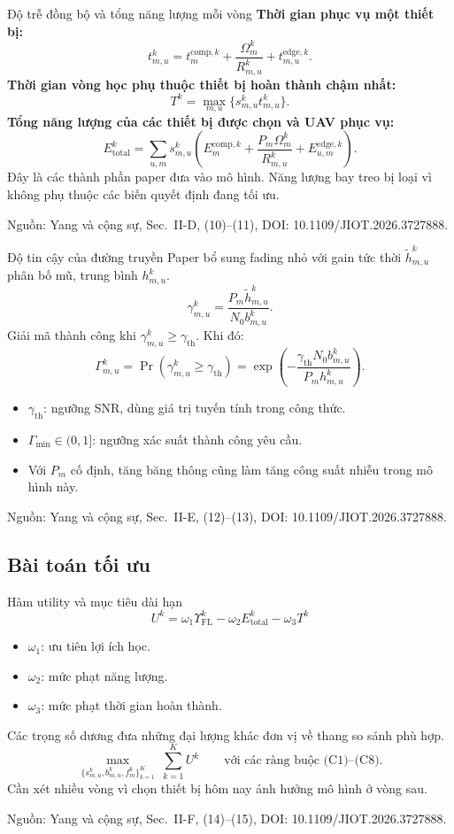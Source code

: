 \documentclass[aspectratio=169,11pt]{beamer}
\newcommand{\source}[1]{\par\vfill{\tiny\color{Muted}Nguồn: #1\par}}
\newcommand{\paperref}[1]{\source{Yang và cộng sự, Sec.~#1, DOI: 10.1109/JIOT.2026.3727888.}}
\newcommand{\FL}{\mathrm{FL}}
\newcommand{\tot}{\mathrm{total}}
\begin{document}
\begin{frame}{Độ trễ đồng bộ và tổng năng lượng mỗi vòng}
  \textbf{Thời gian phục vụ một thiết bị:}
  \[
    t_{m,u}^k=t_m^{\mathrm{comp},k}
       +\frac{\Omega_m^k}{R_{m,u}^k}+t_{m,u}^{\mathrm{edge},k}.
  \]
  \textbf{Thời gian vòng học phụ thuộc thiết bị hoàn thành chậm nhất:}
  \[
    T^k=\max_{m,u}\bigl\{s_{m,u}^k t_{m,u}^k\bigr\}.
  \]
  \textbf{Tổng năng lượng của các thiết bị được chọn và UAV phục vụ:}
  \[
    E_{\tot}^k=\sum_{u,m}s_{m,u}^k
      \left(E_m^{\mathrm{comp},k}+\frac{P_m\Omega_m^k}{R_{m,u}^k}
                  +E_{u,m}^{\mathrm{edge},k}\right).
  \]
  {\footnotesize Đây là các thành phần paper đưa vào mô hình. Năng lượng bay treo bị loại vì không phụ thuộc các biến quyết định đang tối ưu.}
  \paperref{II-D, (10)--(11)}
\end{frame}

\begin{frame}{Độ tin cậy của đường truyền}
  Paper bổ sung fading nhỏ với gain tức thời $\widetilde h_{m,u}^k$ phân bố mũ, trung bình $h_{m,u}^k$.
  \[
    \gamma_{m,u}^k=\frac{P_m\widetilde h_{m,u}^k}{N_0b_{m,u}^k}.
  \]
  Giải mã thành công khi $\gamma_{m,u}^k\geq\gamma_{\mathrm{th}}$. Khi đó:
  \[
    \Gamma_{m,u}^k=\Pr(\gamma_{m,u}^k\geq\gamma_{\mathrm{th}})
      =\exp\!\left(-\frac{\gamma_{\mathrm{th}}N_0b_{m,u}^k}
                               {P_mh_{m,u}^k}\right).
  \]
  \begin{itemize}
    \item $\gamma_{\mathrm{th}}$: ngưỡng SNR, dùng giá trị tuyến tính trong công thức.
    \item $\Gamma_{\min}\in(0,1]$: ngưỡng xác suất thành công yêu cầu.
    \item Với $P_m$ cố định, tăng băng thông cũng làm tăng công suất nhiễu trong mô hình này.
  \end{itemize}
  \paperref{II-E, (12)--(13)}
\end{frame}

\subsection{Bài toán tối ưu}

\begin{frame}{Hàm utility và mục tiêu dài hạn}
  \[
    \boxed{U^k=\omega_1\Upsilon_{\FL}^k-\omega_2 E_{\tot}^k-\omega_3T^k}
  \]
  \begin{itemize}
    \item $\omega_1$: ưu tiên lợi ích học.
    \item $\omega_2$: mức phạt năng lượng.
    \item $\omega_3$: mức phạt thời gian hoàn thành.
  \end{itemize}
  Các trọng số dương đưa những đại lượng khác đơn vị về thang so sánh phù hợp.
  \[
    \max_{\{s_{m,u}^k,b_{m,u}^k,f_m^k\}_{k=1}^{K}}
         \ \sum_{k=1}^{K}U^k
         \qquad\text{với các ràng buộc (C1)--(C8).}
  \]
  Cần xét nhiều vòng vì chọn thiết bị hôm nay ảnh hưởng mô hình ở vòng sau.
  \paperref{II-F, (14)--(15)}
\end{frame}
\end{document}
